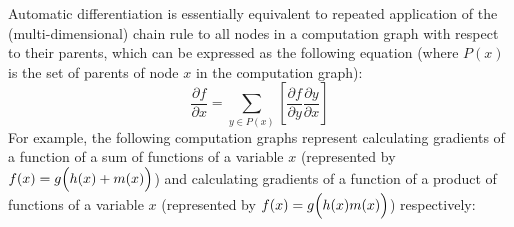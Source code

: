 Automatic differentiation is essentially equivalent to repeated application of the (multi-dimensional) chain rule to all nodes in a computation graph with respect to their parents, which can be expressed as the following equation (where $P(x)$ is the set of parents of node $x$ in the computation graph):
\begin{equation}
    \frac{\partial f}{\partial x} = \sum_{y\in P(x)}{\left[ \frac{\partial f}{\partial y}\frac{\partial y}{\partial x}\right]}
\end{equation}
For example, the following computation graphs represent calculating gradients of a function of a sum of functions of a variable $x$ (represented by $f(x) = g\Bigl(h(x) + m(x)\Bigr)$) and calculating gradients of a function of a product of functions of a variable $x$ (represented by $f(x) = g\Bigl(h(x) m(x)\Bigr)$) respectively:
